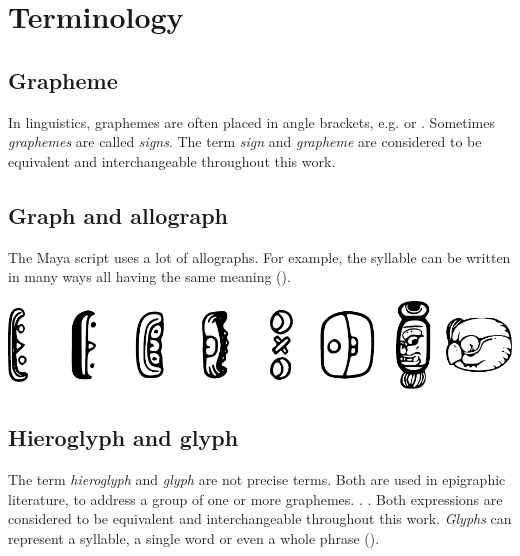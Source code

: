 \documentclass[../main.tex]{subfiles}
\begin{document}
\chapter{Terminology}

\section{Grapheme}
In linguistics, graphemes are often placed in angle brackets, e.g.  or .
Sometimes \emph{graphemes} are called \emph{signs}.
The term \emph{sign} and \emph{grapheme} are considered to be equivalent and 
interchangeable throughout this work.

\section{Graph and allograph}
The Maya script uses a lot of allographs.
For example, the syllable  can be written in many ways all having the same meaning 
().
\begin{center}
    \includegraphics[width=\textwidth,keepaspectratio]{img/grapheme-u-allographs}
    \label{fig:terminology-grapheme-u-allographs}
\end{center}

\section{Hieroglyph and glyph}
The term \emph{hieroglyph} and \emph{glyph} are not precise terms.
Both are used in epigraphic literature, to address a group of one or more graphemes.
.
. 
Both expressions are considered to be equivalent and interchangeable throughout this work.
\emph{Glyphs} can represent a syllable, a single word or even a whole phrase 
(\cite[23]{macrilooper2003}).
\end{document}
